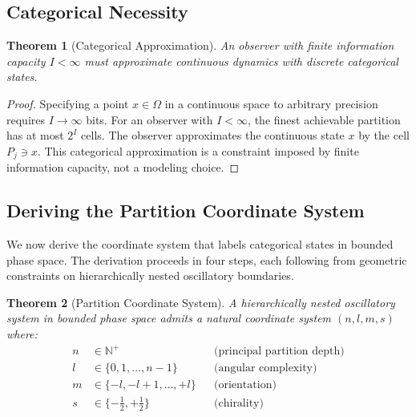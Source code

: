 \documentclass[11pt,a4paper]{article}
\newtheorem{theorem}{Theorem}[section]
\theoremstyle{definition}
\theoremstyle{remark}
\newcommand{\Natural}{\mathbb{N}}
\begin{document}
\subsection{Categorical Necessity}

\begin{theorem}[Categorical Approximation]
\label{thm:categorical}
An observer with finite information capacity $I < \infty$ must approximate continuous dynamics with discrete categorical states.
\end{theorem}

\begin{proof}
Specifying a point $x \in \Omega$ in a continuous space to arbitrary precision requires $I \to \infty$ bits. For an observer with $I < \infty$, the finest achievable partition has at most $2^I$ cells. The observer approximates the continuous state $x$ by the cell $P_j \ni x$. This categorical approximation is a constraint imposed by finite information capacity, not a modeling choice.
\end{proof}

\subsection{Deriving the Partition Coordinate System}

We now derive the coordinate system that labels categorical states in bounded phase space. The derivation proceeds in four steps, each following from geometric constraints on hierarchically nested oscillatory boundaries.

\begin{theorem}[Partition Coordinate System]
\label{thm:coordinates}
A hierarchically nested oscillatory system in bounded phase space admits a natural coordinate system $(n, l, m, s)$ where:
\begin{align}
n &\in \Natural^+ && \text{(principal partition depth)} \label{eq:n} \\
l &\in \{0, 1, \ldots, n-1\} && \text{(angular complexity)} \label{eq:l} \\
m &\in \{-l, -l+1, \ldots, +l\} && \text{(orientation)} \label{eq:m} \\
s &\in \{-\tfrac{1}{2}, +\tfrac{1}{2}\} && \text{(chirality)} \label{eq:s}
\end{align}
\end{theorem}
\end{document}

